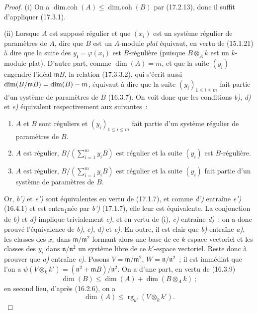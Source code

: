 \begin{proof}
\textnormal{(i)} On a
$\operatorname{dim.coh}(A)\leq\operatorname{dim.coh}(B)$ par (17.2.13), donc
il suffit d'appliquer (17.3.1).

\textnormal{(ii)} Lorsque $A$ est supposé régulier et que $(x_i)$ est un
système régulier de paramètres de $A$, dire que $B$ est un $A$-module
\emph{plat} équivaut, en vertu de (15.1.21) à dire que la suite des
$y_{\boldsymbol{i}}=\varphi(x_{\boldsymbol{i}})$ est $B$-régulière (puisque $B\otimes_A k$ est un
$k$-module plat). D'autre part, comme $\dim(A)=m$, et que la suite $(y_i)$
engendre l'idéal $\mathfrak{m}B$, la relation (17.3.3.2), qui s'écrit aussi
$\dim(B/\mathfrak{m}B)=\dim(B)- m$, équivaut à dire que la suite
$(y_i)_{1\leq i\leq m}$ fait partie d'un système de paramètres de $B$
(16.3.7). On voit donc que les conditions \emph{b)}, \emph{d)} et \emph{e)} équivalent
respectivement aux suivantes~:
\begin{enumerate}
  \item[\textit{b')}] $A$ et $B$ sont réguliers et $(y_i)_{1\leq i\leq m}$ fait
  partie d'un système régulier de paramètres de $B$.
  \item[\textit{d')}] $A$ est régulier,
  $B/(\sum_{i=1}^m y_iB)$ est régulier et la suite $(y_i)$ est
  $B$-régulière.
  \item[\textit{e')}] $A$ est régulier,
  $B/(\sum_{i=1}^m y_iB)$ est régulier et la suite $(y_i)$ fait partie d'un
  système de paramètres de $B$.
\end{enumerate}

Or, \emph{b')} et \emph{e')} sont équivalentes en vertu de (17.1.7), et comme \emph{d')} entraîne
\emph{e')} (16.4.1) et est entra\textsubscript{1}née par \emph{b')} (17.1.7), elle leur est équivalente. La
conjonction
de \emph{b)} et \emph{d)} implique trivialement \emph{c)}, et en vertu de (i), \emph{c)} entraîne \emph{d)}~; on
a donc prouvé l'équivalence de \emph{b)}, \emph{c)}, \emph{d)} et \emph{e)}. En outre, il est clair que \emph{b)}
entraîne \emph{a)}, les classes des $x_i$ dans
$\mathfrak{m}/\mathfrak{m}^2$ formant alors une base de ce $k$-espace
vectoriel et les classes des $y_i$ dans $\mathfrak{n}/\mathfrak{n}^2$ un
système libre de ce $k'$-espace vectoriel. Reste donc à prouver que \emph{a)}
entraîne \emph{e)}. Posons $V=\mathfrak{m}/\mathfrak{m}^2$,
$W=\mathfrak{n}/\mathfrak{n}^2$~; il est immédiat que l'on a
$\psi(V\otimes_k k')=(\mathfrak{n}^2+\mathfrak{m}B)/\mathfrak{n}^2$. On a
d'une part, en vertu de (16.3.9)
\begin{equation}
\label{0.17.3.3.3-fr}
\tag{17.3.3.3}
  \dim(B)\leq\dim(A)+\dim(B\otimes_A k)~;
\end{equation}
en second lieu, d'après (16.2.6), on a
\begin{equation}
\label{0.17.3.3.4-fr}
\tag{17.3.3.4}
  \dim(A)\leq\operatorname{rg}_{k'}(V\otimes_k k').
\end{equation}


\end{proof}
